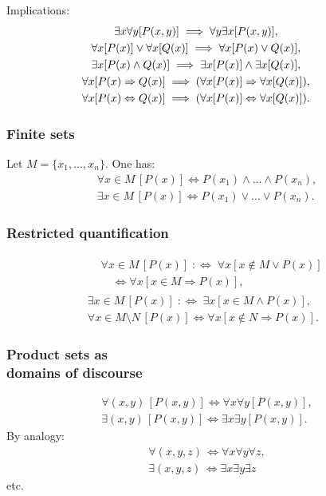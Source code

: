 Implications:
\begin{gather}
\hspace{-2em}\exists x\forall y[P(x,y)]\implies \forall y\exists x[P(x,y)],\\
\hspace{-2em}\forall x[P(x)]\lor\forall x[Q(x)]\implies\forall x[P(x)\lor Q(x)],\\
\hspace{-2em}\exists x[P(x)\land Q(x)]\implies
  \exists x[P(x)]\land \exists x[Q(x)],\\
\hspace{-2em}\forall x[P(x)\Rightarrow Q(x)]\implies
  (\forall x[P(x)]\Rightarrow\forall x[Q(x)]),\\
\hspace{-2em}\forall x[P(x)\Leftrightarrow Q(x)]\implies
  (\forall x[P(x)]\Leftrightarrow\forall x[Q(x)]).
\end{gather}

\subsubsection{Finite sets}
Let $M=\{x_1,\ldots,x_n\}$. One has:
\begin{gather}
\forall x{\in}M\,[P(x)]\iff P(x_1)\land\ldots\land P(x_n),\\
\exists x{\in}M\,[P(x)]\iff P(x_1)\lor\ldots\lor P(x_n).
\end{gather}

\subsubsection{Restricted quantification}
\begin{gather}
\begin{split}
& \forall x{\in}M\,[P(x)]\;:\Longleftrightarrow\;\forall x[x\notin M\lor P(x)]\\
& \quad\iff\forall x[x\in M\Rightarrow P(x)],
\end{split}\\
\exists x{\in}M\,[P(x)]\;:\Longleftrightarrow\;\exists x[x\in M\land P(x)],\\
\forall x{\in}M{\setminus}N\,[P(x)]\iff \forall x[x\notin N\Rightarrow P(x)].
\end{gather}

\subsubsection{Product sets as\\
domains of discourse}
\begin{gather}
\forall(x,y)\,[P(x,y)]\iff \forall x\forall y[P(x,y)],\\
\exists(x,y)\,[P(x,y)]\iff \exists x\exists y[P(x,y)].
\end{gather}
By analogy:
\begin{gather}
\forall(x,y,z)\,\iff \forall x\forall y\forall z,\\
\exists(x,y,z)\,\iff \exists x\exists y\exists z
\end{gather}
etc.

